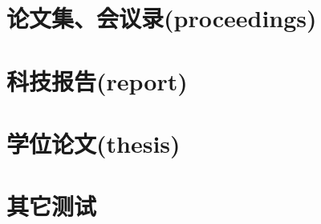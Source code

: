 \documentclass{article}
\begin{document}
\section{论文集、会议录(proceedings)}\newrefsection
\nocite{aproceedings1}
\nocite{aproceedings2}
\nocite{aproceedings3}
\printbibliography[heading=nobibhead]

\section{科技报告(report)}\newrefsection
\nocite{areport1}
\nocite{areport2}
\printbibliography[heading=nobibhead]

\section{学位论文(thesis)}\newrefsection
\nocite{athesis1}
\nocite{athesis2}
\printbibliography[heading=nobibhead]

\section{其它测试}\newrefsection
\nocite{booknoauthor}
\nocite{booknolocation}
\nocite{booknopublisher}
\nocite{booknodate}
\nocite{booknopages}
\nocite{bookadd1}
\nocite{inproceeding1}
\nocite{articlemorenames}
\printbibliography[heading=bibhead]
\end{document}
